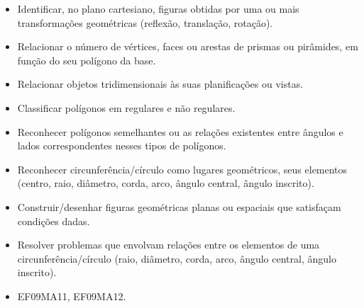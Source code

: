 \begin{escolha}
{{{\begin{escolha}
{\begin{itemize}
  \item Identificar, no plano cartesiano, figuras obtidas por uma ou mais
transformações geométricas (reflexão, translação, rotação).
  \item Relacionar o número de vértices, faces ou arestas de prismas ou
pirâmides, em função do seu polígono da base.
  \item Relacionar objetos tridimensionais às suas planificações ou vistas.
  \item Classificar polígonos em regulares e não regulares.
  \item Reconhecer polígonos semelhantes ou as relações existentes entre
ângulos e lados correspondentes nesses tipos de polígonos.
  \item Reconhecer circunferência/círculo como lugares geométricos, seus
elementos (centro, raio, diâmetro, corda, arco, ângulo central, ângulo
inscrito).
  \item Construir/desenhar figuras geométricas planas ou espaciais que
satisfaçam condições dadas.
  \item Resolver problemas que envolvam relações entre os elementos de uma
circunferência/círculo (raio, diâmetro, corda, arco, ângulo central, ângulo
inscrito).

\end{itemize} 


\begin{itemize}
  \item EF09MA11, EF09MA12.
\end{itemize}

}
\end{escolha}}}}
\end{escolha}
